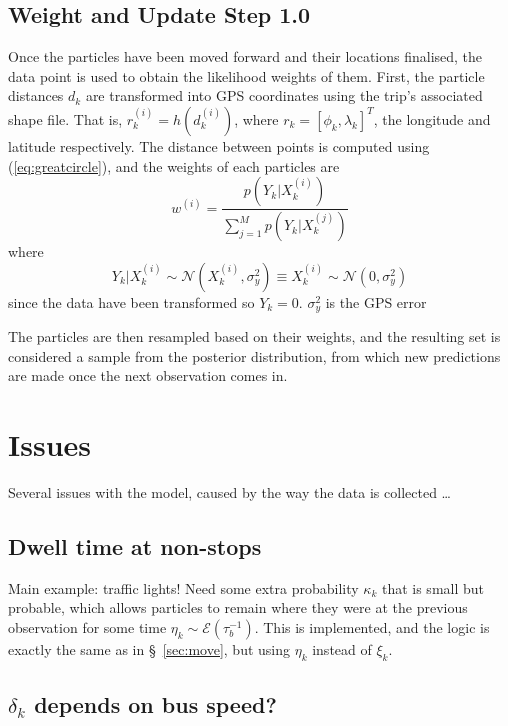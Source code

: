 \documentclass[10pt,a4paper]{article}
\begin{document}
\subsection{Weight and Update Step 1.0}

Once the particles have been moved forward and their locations finalised, the data point is used to 
obtain the likelihood weights of them.
First, the particle distances $d_k$ are transformed into GPS coordinates using the trip's associated 
shape file. 
That is, $r_k^{(i)} = h(d_k^{(i)})$, where $r_k = [\phi_k, \lambda_k]^T$, the longitude and latitude
respectively.
The distance between points is computed using (\ref{eq:greatcircle}), 
and the weights of each particles are
\begin{equation}
  \label{eq:particle_weights}
  w^{(i)} = \frac{p(Y_k | X_k^{(i)})}{\sum_{j=1}^M p(Y_k | X_k^{(j)})}
\end{equation}
where
\begin{equation}
  \label{eq:particle_lhood}
  Y_k | X_k^{(i)} \sim \mathcal{N}\left(X_k^{(i)}, \sigma_y^2\right) \equiv
  X_k^{(i)} \sim \mathcal{N}\left(0, \sigma_y^2\right)
\end{equation}
since the data have been transformed so $Y_k = 0$.
$\sigma_y^2$ is the GPS error

The particles are then resampled based on their weights, and the resulting set is considered
a sample from the posterior distribution, from which new predictions are made once the next 
observation comes in.



\section{Issues}

Several issues with the model, caused by the way the data is collected \ldots


\subsection{Dwell time at non-stops}

Main example: traffic lights! 
Need some extra probability $\kappa_k$ that is small but probable, 
which allows particles to remain where they were at the previous observation
for some time $\eta_k \sim \mathcal{E}(\tau_b^{-1})$.
This is implemented, and the logic is exactly the same as in \S~\ref{sec:move},
but using $\eta_k$ instead of $\xi_k$.


\subsection{$\delta_k$ depends on bus speed?}
\end{document}
